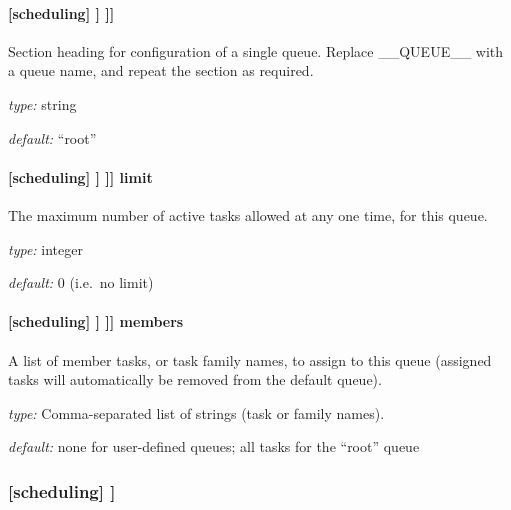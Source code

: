 \paragraph[{[[[}\_\_QUEUE\_\_{]]]}]{[scheduling] \textrightarrow [[queues]] \textrightarrow [[[\_\_QUEUE\_\_]]]}

Section heading for configuration of a single queue. Replace
\_\_QUEUE\_\_ with a queue name, and repeat the section as required.

\begin{myitemize}
\item {\em type:} string
\item {\em default:} ``root''
\end{myitemize}

\paragraph[limit]{[scheduling] \textrightarrow [[queues]] \textrightarrow [[[\_\_QUEUE\_\_]]] \textrightarrow limit}

The maximum number of active tasks allowed at any one time, for this queue.
\begin{myitemize}
\item {\em type:} integer
\item {\em default:} 0 (i.e.\ no limit)
\end{myitemize}

\paragraph[members]{[scheduling] \textrightarrow [[queues]] \textrightarrow [[[\_\_QUEUE\_\_]]] \textrightarrow members}

A list of member tasks, or task family names, to assign to this queue
(assigned tasks will automatically be removed from the default queue).
\begin{myitemize}
\item {\em type:} Comma-separated list of strings (task or family names).
\item {\em default:} none for user-defined queues; all tasks for the ``root'' queue
\end{myitemize}

\subsubsection[{[[}special tasks{]]}]{[scheduling] \textrightarrow [[special tasks]]}

